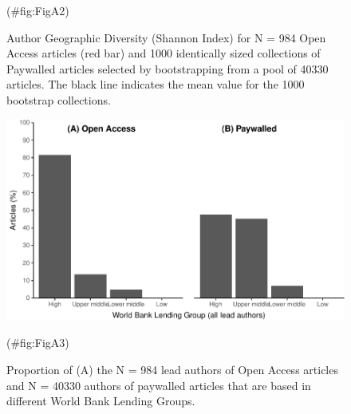 \begin{appendix}
\begin{figure}
{}

\caption{Author Geographic Diversity (Shannon Index) for N =  984  Open Access articles (red bar) and 1000 identically sized collections of Paywalled articles selected by bootstrapping from a pool of  40330  articles. The black line indicates the mean value for the 1000 bootstrap collections.}(\#fig:FigA2)
\end{figure}

\begin{figure}

{\centering \includegraphics{Smith_etal_APC_ms_files/figure-latex/FigA3-1} 

}

\caption{Proportion of (A) the N =  984  lead authors of Open Access articles and N =   40330  authors of paywalled articles that are based in different World Bank Lending Groups.}(\#fig:FigA3)
\end{figure}

\newpage
\blandscape
\begin{table}


\end{table}
\end{appendix}
